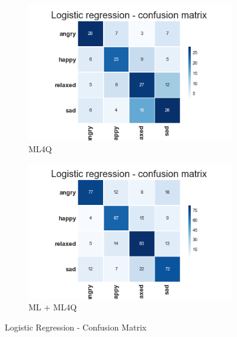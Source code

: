 \begin{figure}[H]
  \centering
  \begin{subfigure}[b]{0.49\linewidth}
    \includegraphics[width=\linewidth]{./chapters/chapter5/images/4Q/CM_LR.png}
    \caption{ML4Q}
  \end{subfigure}
  \begin{subfigure}[b]{0.49\linewidth}
   \includegraphics[width=\linewidth]{./chapters/chapter5/images/join/CM_LR.png}
    \caption{ML + ML4Q}
  \end{subfigure}
  \caption{Logistic Regression - Confusion Matrix}
  \label{fig:lr}
\end{figure}

